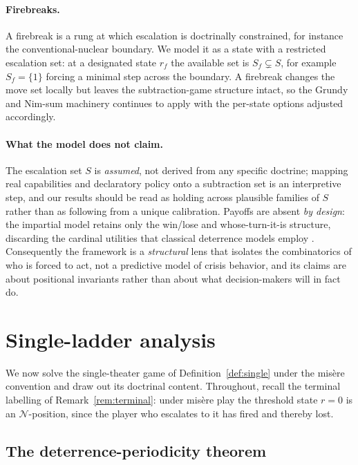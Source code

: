 \documentclass[11pt]{article}
\theoremstyle{plain}
\theoremstyle{definition}
\theoremstyle{remark}
\begin{document}
\paragraph{Firebreaks.}
A firebreak is a rung at which escalation is doctrinally constrained, for
instance the conventional-nuclear boundary. We model it as a state with a
restricted escalation set: at a designated state $r_f$ the available set is
$S_f \subsetneq S$, for example $S_f=\{1\}$ forcing a minimal step across
the boundary. A firebreak changes the move set locally but leaves the
subtraction-game structure intact, so the Grundy and Nim-sum machinery
continues to apply with the per-state options adjusted accordingly.

\paragraph{What the model does not claim.}
The escalation set $S$ is \emph{assumed}, not derived from any specific
doctrine; mapping real capabilities and declaratory policy onto a subtraction
set is an interpretive step, and our results should be read as holding across
plausible families of $S$ rather than as following from a unique
calibration. Payoffs are absent \emph{by design}: the impartial model retains
only the win/lose and whose-turn-it-is structure, discarding the cardinal
utilities that classical deterrence models employ \citep{powell1990,
brams1985}. Consequently the framework is a \emph{structural} lens that
isolates the combinatorics of who is forced to act, not a predictive model of
crisis behavior, and its claims are about positional invariants rather than
about what decision-makers will in fact do.

\section{Single-ladder analysis}\label{sec:single}

We now solve the single-theater game of Definition~\ref{def:single} under
the mis\`ere convention and draw out its doctrinal content. Throughout, recall
the terminal labelling of Remark~\ref{rem:terminal}: under mis\`ere play the
threshold state $r=0$ is an $\mathcal{N}$-position, since the player who
escalates to it has fired and thereby lost.

\subsection{The deterrence-periodicity theorem}
\end{document}
